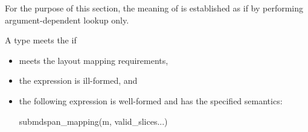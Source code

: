 \pnum
{}%
For the purpose of this section,
the meaning of  is established
as if by performing argument-dependent lookup only.

\pnum
A type  meets the  if
\begin{itemize}
\item
{} meets the layout mapping requirements,
\item
the expression  is ill-formed, and
\item
the following expression is well-formed and has the specified semantics:
\begin{codeblock}
submdspan_mapping(m, valid_slices...)
\end{codeblock}
\end{itemize}

